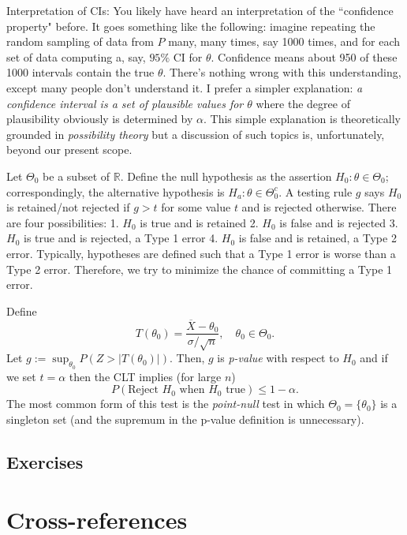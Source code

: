 \documentclass[]{book}
\begin{document}
Interpretation of CIs: You likely have heard an interpretation of the
``confidence property" before. It goes something like the following:
imagine repeating the random sampling of data from \(P\) many, many
times, say 1000 times, and for each set of data computing a, say,
\(95\%\) CI for \(\theta\). Confidence means about 950 of these 1000
intervals contain the true \(\theta\). There's nothing wrong with this
understanding, except many people don't understand it. I prefer a
simpler explanation: \emph{a confidence interval is a set of plausible
values for \(\theta\)} where the degree of plausibility obviously is
determined by \(\alpha\). This simple explanation is theoretically
grounded in \emph{possibility theory} but a discussion of such topics
is, unfortunately, beyond our present scope.

Let \(\Theta_0\) be a subset of \(\mathbb{R}\). Define the null
hypothesis as the assertion \(H_0: \theta\in \Theta_0\);
correspondingly, the alternative hypothesis is
\(H_a: \theta\in \Theta_0^c\). A testing rule \(g\) says \(H_0\) is
retained/not rejected if \(g>t\) for some value \(t\) and is rejected
otherwise. There are four possibilities: 1. \(H_0\) is true and is
retained 2. \(H_0\) is false and is rejected 3. \(H_0\) is true and is
rejected, a Type 1 error 4. \(H_0\) is false and is retained, a Type 2
error. Typically, hypotheses are defined such that a Type 1 error is
worse than a Type 2 error. Therefore, we try to minimize the chance of
committing a Type 1 error.

Define
\[T(\theta_0) = \frac{\overline X - \theta_0}{\sigma/\sqrt{n}}, \quad \theta_0 \in \Theta_0.\]
Let \(g:= \sup_{\theta_0} P(Z > |T(\theta_0)|)\). Then, \(g\) is
\emph{p-value} with respect to \(H_0\) and if we set \(t = \alpha\) then
the CLT implies (for large \(n\))
\[P(\text{Reject }H_0\text{ when }H_0\text{ true}) \leq 1-\alpha.\] The
most common form of this test is the \emph{point-null} test in which
\(\Theta_0 = \{\theta_0\}\) is a singleton set (and the supremum in the
p-value definition is unnecessary).

\section{Exercises}\label{exercises}

\hypertarget{cross}{\chapter{Cross-references}\label{cross}}
\end{document}
